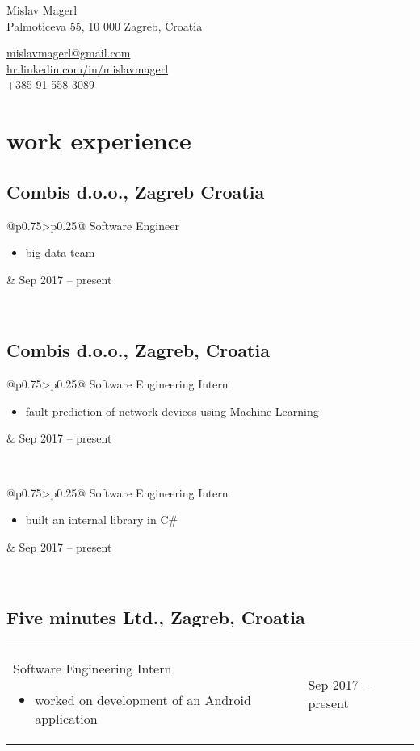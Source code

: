 \documentclass[a4paper]{article}
\makeatletter
\newlength{\tablewidth}
\newenvironment{period}[2]{%
\newcommand{\sarma}{#2}%
\setlength{\tablewidth}{\linewidth}
\addtolength{\tablewidth}{-2\tabcolsep}
\begin{tabular}{@{}p{0.75\tablewidth}>{\raggedleft\arraybackslash}p{0.25\tablewidth}@{}}%
#1 \newline
\begin{itemize}
}{%
\end{itemize} & \sarma \\%
\end{tabular}\\
}
\makeatother
\begin{document}
\fontfamily{\sfdefault}
\selectfont

\begin{minipage}{.5\textwidth}
\LARGE{Mislav Magerl}\\
\normalsize{Palmoticeva 55, 10 000 Zagreb, Croatia}
\end{minipage}%
\begin{minipage}{.5\textwidth}
\raggedleft
\href{mailto:mislavmagerl@gmail.com}{mislavmagerl@gmail.com} \\
\href{https://hr.linkedin.com/in/mislavmagerl}{hr.linkedin.com/in/mislavmagerl} \\
+385 91 558 3089
\end{minipage}

\vspace{1em}

\section{work experience}
\subsection{Combis d.o.o., Zagreb Croatia}
\begin{period}{Software Engineer}{Sep 2017 -- present}
	\item
		big data team
\end{period}

\subsection{Combis d.o.o., Zagreb, Croatia}
\begin{period}{Software Engineering Intern}{Jul 2016 -- Oct 2016}
    \item 
        fault prediction of network devices using Machine Learning
\end{period}
\begin{period}{Software Engineering Intern}{Jan 2016 -- Feb 2016}
    \item 
        built an internal library in C\#
\end{period}
\subsection{Five minutes Ltd., Zagreb, Croatia}
\begin{period}{Software Engineering Intern}{Jul 2015 -- Aug 2015}
    \item 
        worked on development of an Android application
\end{period}
\end{document}
